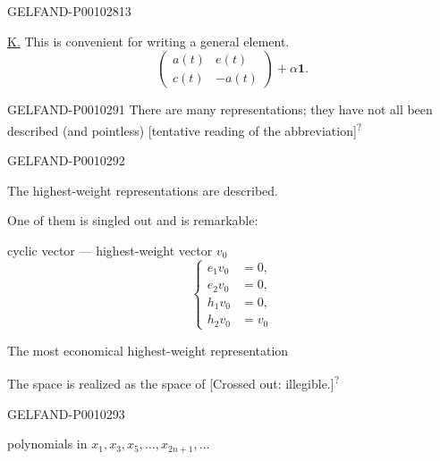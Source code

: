 \begin{GelfandAdjacentEvidence}{GELFAND-P001028}{13}


\underline{K.} This is convenient for writing a general element.
\begin{equation*}
\begin{pmatrix}a(t)&e(t)\\c(t)&-a(t)\end{pmatrix}+\alpha\mathbf1.
\tag{3}
\end{equation*}
\end{GelfandAdjacentEvidence}



\begin{GelfandAdjacentEvidence}{GELFAND-P001029}{1}
There are many representations; they have not all been described (and pointless) [tentative reading of the abbreviation]\textsuperscript{?}
\end{GelfandAdjacentEvidence}
\begin{GelfandAdjacentEvidence}{GELFAND-P001029}{2}


The highest-weight representations are described.

One of them is singled out and is remarkable:

cyclic vector --- highest-weight vector $v_0$
\begin{equation*}
\left\{\begin{aligned}
e_1v_0&=0,\\
e_2v_0&=0,\\
h_1v_0&=0,\\
h_2v_0&=v_0
\end{aligned}\right.
\tag{4}
\end{equation*}

The most economical highest-weight representation

The space is realized as the space of [Crossed out: illegible.]\textsuperscript{?}
\end{GelfandAdjacentEvidence}
\begin{GelfandAdjacentEvidence}{GELFAND-P001029}{3}

polynomials in $x_1,x_3,x_5,\ldots,x_{2n+1},\ldots$
\end{GelfandAdjacentEvidence}
